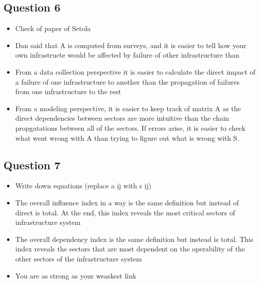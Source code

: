 \documentclass[11pt,a4paper]{article}
\begin{document}
\subsection*{Question 6}
\begin{itemize}
	\item Check of paper of Setola
	\item Dan said that A is computed from surveys, and it is easier to tell how your own infrastructe would be affected by failure of other infrastructure than
	\item From a data collection perspective it is easier to calculate the direct impact of a failure of one infrastructure to another than the propagation of failures from one infrastructure to the rest
	\item From a modeling perspective, it is easier to keep track of matrix A as the direct dependencies between sectors are more intuitive than the chain propgatations between all of the sectors. If errors arise, it is easier to check what went wrong with A than trying to figure out what is wrong with S. 
\end{itemize}

\subsection*{Question 7}
\begin{itemize}
	\item Write down equations (replace a ij with s ij)
	\item The overall influence index in a way is the same definition but instead of direct is total. At the end, this index reveals the most critical sectors of infrastructure system
	\item The overall dependency index is the same definition but instead is total. This index reveals the sectors that are most dependent on the operability of the other sectors of the infrastructure system
	\item You are as strong as your weaskest link 
\end{itemize}
\end{document}
